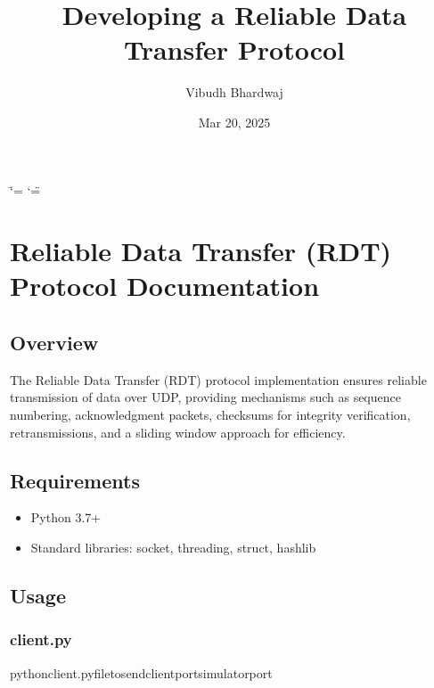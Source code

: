 \documentclass[letterpaper,10pt,english]{sphinxmanual}
\title{Developing a Reliable Data Transfer Protocol}
\date{Mar 20, 2025}
\author{Vibudh Bhardwaj}
\begin{document}
\ifdefined\shorthandoff
  \ifnum\catcode`\=\string=\active\shorthandoff{=}\fi
  \ifnum\catcode`\"=\active{}\fi
\fi

\pagestyle{empty}
\sphinxmaketitle
\pagestyle{plain}
\sphinxtableofcontents
\pagestyle{normal}
\label{\detokenize{index::doc}}


\sphinxstepscope


\chapter{Reliable Data Transfer (RDT) Protocol Documentation}
\label{\detokenize{documentation:reliable-data-transfer-rdt-protocol-documentation}}\label{\detokenize{documentation::doc}}

\section{Overview}
\label{\detokenize{documentation:overview}}
\sphinxAtStartPar
The Reliable Data Transfer (RDT) protocol implementation ensures reliable transmission of data over UDP, providing mechanisms such as sequence numbering, acknowledgment packets, checksums for integrity verification, retransmissions, and a sliding window approach for efficiency.


\section{Requirements}
\label{\detokenize{documentation:requirements}}\begin{itemize}
\item {} 
\sphinxAtStartPar
Python 3.7+

\item {} 
\sphinxAtStartPar
Standard libraries: socket, threading, struct, hashlib

\end{itemize}


\section{Usage}
\label{\detokenize{documentation:usage}}

\subsection{client.py}
\label{\detokenize{documentation:client-py}}
\begin{sphinxVerbatim}[commandchars=\\\{\}]
pythonclient.py\PYGZlt{}file\PYGZus{}to\PYGZus{}send\PYGZgt{}\PYGZlt{}client\PYGZus{}port\PYGZgt{}\PYGZlt{}simulator\PYGZus{}port\PYGZgt{}
\end{sphinxVerbatim}
\end{document}
